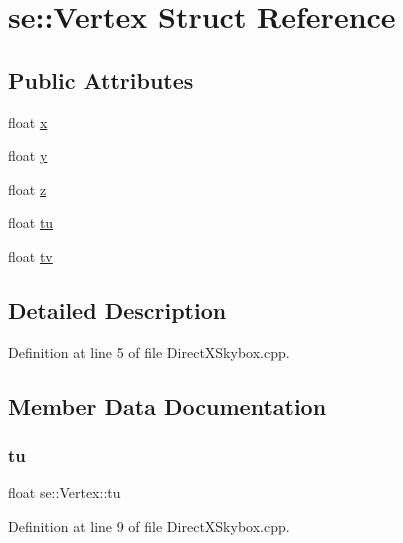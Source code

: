 \hypertarget{structse_1_1_vertex}{}\section{se\+:\+:Vertex Struct Reference}
\label{structse_1_1_vertex}
\subsection*{Public Attributes}
\begin{DoxyCompactItemize}
\item 
float \mbox{\hyperlink{structse_1_1_vertex_a861f929c19a2002c84cc45937af25ccd}{x}}
\item 
float \mbox{\hyperlink{structse_1_1_vertex_a6e79ab7f589edb89969385db39405297}{y}}
\item 
float \mbox{\hyperlink{structse_1_1_vertex_a2a709adb9f77c1611363a550e658983b}{z}}
\item 
float \mbox{\hyperlink{structse_1_1_vertex_a8c002af2126ae5cd8dac03ec2adcb060}{tu}}
\item 
float \mbox{\hyperlink{structse_1_1_vertex_abd48156d7a9e157ca38d4c4de2101524}{tv}}
\end{DoxyCompactItemize}


\subsection{Detailed Description}


Definition at line 5 of file Direct\+X\+Skybox.\+cpp.



\subsection{Member Data Documentation}
\mbox{\label{structse_1_1_vertex_a8c002af2126ae5cd8dac03ec2adcb060}} 
\subsubsection{\texorpdfstring{tu}{tu}}
{\footnotesize\ttfamily float se\+::\+Vertex\+::tu}



Definition at line 9 of file Direct\+X\+Skybox.\+cpp.

\mbox{\label{structse_1_1_vertex_abd48156d7a9e157ca38d4c4de2101524}} 
